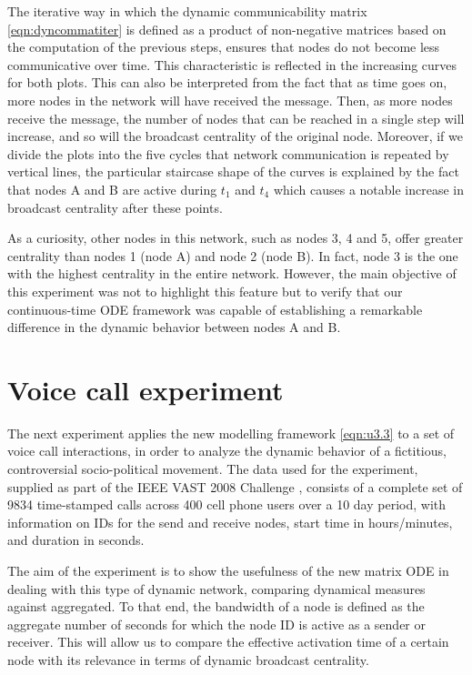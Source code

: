 The iterative way in which the dynamic communicability matrix \eqref{eqn:dyncommatiter} is defined as a product of non-negative matrices based on the computation of the previous steps, ensures that nodes do not become less communicative over time. This characteristic is reflected in the increasing curves for both plots. This can also be interpreted from the fact that as time goes on, more nodes in the network will have received the message. Then, as more nodes receive the message, the number of nodes that can be reached in a single step will increase, and so will the broadcast centrality of the original node. Moreover, if we divide the plots into the five cycles that network communication is repeated by vertical lines, the particular staircase shape of the curves is explained by the fact that nodes A and B are active during $t_1$ and $t_4$ which causes a notable increase in broadcast centrality after these points.

As a curiosity, other nodes in this network, such as nodes 3, 4 and 5, offer greater centrality than nodes 1 (node A) and node 2 (node B). In fact, node 3 is the one with the highest centrality in the entire network. However, the main objective of this experiment was not to highlight this feature but to verify that our continuous-time ODE framework was capable of establishing a remarkable difference in the dynamic behavior between nodes A and B.

\section{Voice call experiment}
\label{sec:voicecall}
The next experiment applies the new modelling framework \eqref{eqn:u3.3} to a set of voice call interactions, in order to analyze the dynamic behavior of a fictitious, controversial socio-political movement. The data used for the experiment, supplied as part of the IEEE VAST 2008 Challenge \cite{grinstein2008vast}, consists of a complete set of 9834 time-stamped calls across 400 cell phone users over a 10 day period, with information on IDs for the send and receive nodes, start time in hours/minutes, and duration in seconds.

The aim of the experiment is to show the usefulness of the new matrix ODE in dealing with this type of dynamic network, comparing dynamical measures against aggregated. To that end, the bandwidth of a node is defined as the aggregate number of seconds for which the node ID is active as a sender or receiver. This will allow us to compare the effective activation time of a certain node with its relevance in terms of dynamic broadcast centrality.

